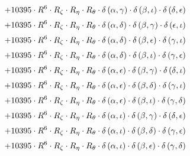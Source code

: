 \begin{subequations}
\begin{gather}
 \\[0.2em] \notag 		 + 10395 \cdot R^{6} \cdot R_{\zeta{}} \cdot R_{\eta{}} \cdot R_{\theta{}} \cdot \delta{}\left(\alpha{}, \gamma{}\right) \cdot \delta{}\left(\beta{}, \iota{}\right) \cdot \delta{}\left(\delta{}, \epsilon{}\right) 
 \\[0.2em] \notag 		 + 10395 \cdot R^{6} \cdot R_{\zeta{}} \cdot R_{\eta{}} \cdot R_{\theta{}} \cdot \delta{}\left(\alpha{}, \delta{}\right) \cdot \delta{}\left(\beta{}, \gamma{}\right) \cdot \delta{}\left(\epsilon{}, \iota{}\right) 
 \\[0.2em] \notag 		 + 10395 \cdot R^{6} \cdot R_{\zeta{}} \cdot R_{\eta{}} \cdot R_{\theta{}} \cdot \delta{}\left(\alpha{}, \delta{}\right) \cdot \delta{}\left(\beta{}, \epsilon{}\right) \cdot \delta{}\left(\gamma{}, \iota{}\right) 
 \\[0.2em] \notag 		 + 10395 \cdot R^{6} \cdot R_{\zeta{}} \cdot R_{\eta{}} \cdot R_{\theta{}} \cdot \delta{}\left(\alpha{}, \delta{}\right) \cdot \delta{}\left(\beta{}, \iota{}\right) \cdot \delta{}\left(\gamma{}, \epsilon{}\right) 
 \\[0.2em] \notag 		 + 10395 \cdot R^{6} \cdot R_{\zeta{}} \cdot R_{\eta{}} \cdot R_{\theta{}} \cdot \delta{}\left(\alpha{}, \epsilon{}\right) \cdot \delta{}\left(\beta{}, \gamma{}\right) \cdot \delta{}\left(\delta{}, \iota{}\right) 
 \\[0.2em] \notag 		 + 10395 \cdot R^{6} \cdot R_{\zeta{}} \cdot R_{\eta{}} \cdot R_{\theta{}} \cdot \delta{}\left(\alpha{}, \epsilon{}\right) \cdot \delta{}\left(\beta{}, \delta{}\right) \cdot \delta{}\left(\gamma{}, \iota{}\right) 
 \\[0.2em] \notag 		 + 10395 \cdot R^{6} \cdot R_{\zeta{}} \cdot R_{\eta{}} \cdot R_{\theta{}} \cdot \delta{}\left(\alpha{}, \epsilon{}\right) \cdot \delta{}\left(\beta{}, \iota{}\right) \cdot \delta{}\left(\gamma{}, \delta{}\right) 
 \\[0.2em] \notag 		 + 10395 \cdot R^{6} \cdot R_{\zeta{}} \cdot R_{\eta{}} \cdot R_{\theta{}} \cdot \delta{}\left(\alpha{}, \iota{}\right) \cdot \delta{}\left(\beta{}, \gamma{}\right) \cdot \delta{}\left(\delta{}, \epsilon{}\right) 
 \\[0.2em] \notag 		 + 10395 \cdot R^{6} \cdot R_{\zeta{}} \cdot R_{\eta{}} \cdot R_{\theta{}} \cdot \delta{}\left(\alpha{}, \iota{}\right) \cdot \delta{}\left(\beta{}, \delta{}\right) \cdot \delta{}\left(\gamma{}, \epsilon{}\right) 
 \\[0.2em] \notag 		 + 10395 \cdot R^{6} \cdot R_{\zeta{}} \cdot R_{\eta{}} \cdot R_{\theta{}} \cdot \delta{}\left(\alpha{}, \iota{}\right) \cdot \delta{}\left(\beta{}, \epsilon{}\right) \cdot \delta{}\left(\gamma{}, \delta{}\right) 

\end{gather}
\end{subequations}
